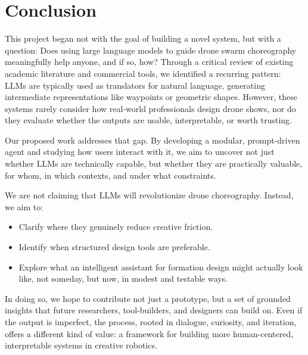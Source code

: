 
\section{Conclusion}

This project began not with the goal of building a novel system, but with a question: Does using large language models to guide drone swarm choreography meaningfully help anyone, and if so, how? Through a critical review of existing academic literature and commercial tools, we identified a recurring pattern: LLMs are typically used as translators for natural language, generating intermediate representations like waypoints or geometric shapes. However, these systems rarely consider how real-world professionals design drone shows, nor do they evaluate whether the outputs are usable, interpretable, or worth trusting.

Our proposed work addresses that gap. By developing a modular, prompt-driven agent and studying how users interact with it, we aim to uncover not just whether LLMs are technically capable, but whether they are practically valuable, for whom, in which contexts, and under what constraints.

We are not claiming that LLMs will revolutionize drone choreography. Instead, we aim to:
\begin{itemize}
  \item Clarify where they genuinely reduce creative friction.
  \item Identify when structured design tools are preferable.
  \item Explore what an intelligent assistant for formation design might actually look like, not someday, but now, in modest and testable ways.
\end{itemize}

In doing so, we hope to contribute not just a prototype, but a set of grounded insights that future researchers, tool-builders, and designers can build on. Even if the output is imperfect, the process, rooted in dialogue, curiosity, and iteration, offers a different kind of value: a framework for building more human-centered, interpretable systems in creative robotics.


